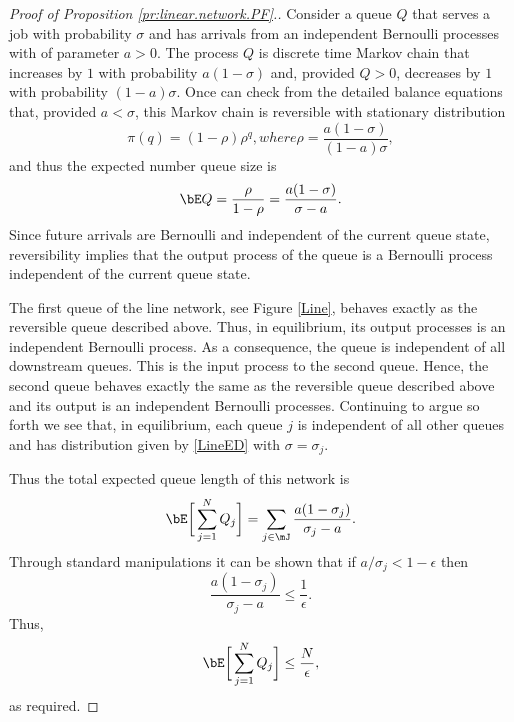 \documentclass{amsart}
\begin{document}
\begin{proof}[Proof of Proposition \ref{pr:linear.network.PF}.]
Consider a queue $Q$ that serves a job with probability $\sigma$ and has arrivals from an independent Bernoulli processes with of parameter $a>0$.
The process $Q$ is discrete time Markov chain that increases by $1$ with probability $a(1-\sigma)$ and, provided $Q>0$, decreases by $1$ with probability $(1- a)\sigma$. Once can check from the detailed balance equations that, provided $a < \sigma$, this Markov chain is reversible with stationary distribution
\begin{subequations}\label{LineED}
\begin{equation}
\pi(q) =(1- \rho) \rho^q,
\end{equation}
where
\begin{equation}
\rho=\frac{a(1-\sigma)}{(1-a)\sigma},
\end{equation}
\end{subequations}
and thus the expected number queue size is
\begin{equation}
\bE Q = \frac{\rho}{1-\rho} = \frac{a (1-\sigma)}{\sigma -a }.
\end{equation}
Since future arrivals are Bernoulli and independent of the current queue state, reversibility implies that the output process of the queue is a Bernoulli process independent of the current queue state.

The first queue of the line network, see Figure \ref{Line}, behaves exactly as the reversible queue described above. Thus, in equilibrium, its output processes is an independent Bernoulli process. As a consequence, the queue is independent of all downstream queues. This is the input process to the second queue. Hence, the second queue behaves exactly the same as the reversible queue described above and its output is an independent Bernoulli processes. Continuing to argue so forth we see that, in equilibrium, each queue $j$ is independent of all other queues and has distribution given by \eqref{LineED} with $\sigma=\sigma_j$.

Thus the total expected queue length of this network is
\begin{equation}
\bE \bigg[ \sum_{j=1}^N Q_j \bigg]  = \sum_{j\in\mJ} \frac{a (1-\sigma_j)}{\sigma_j -a }.
\end{equation}
Through standard manipulations it can be shown that if $a/\sigma_j < 1- \epsilon$ then
\begin{equation}
\frac{a (1-\sigma_j)}{\sigma_j -a } \leq \frac{1}{\epsilon}.
\end{equation}
Thus,
\begin{equation}
\bE \bigg[ \sum_{j=1}^N Q_j \bigg]  \leq \frac{N}{\epsilon},
\end{equation}
as required.
\end{proof}
\end{document}
